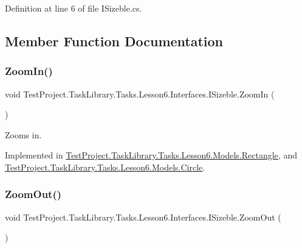 Definition at line 6 of file I\+Sizeble.\+cs.



\subsection{Member Function Documentation}
\mbox{\label{interface_test_project_1_1_task_library_1_1_tasks_1_1_lesson6_1_1_interfaces_1_1_i_sizeble_ada6181d54740d570d1575307c2574a0d}} 
\subsubsection{\texorpdfstring{ZoomIn()}{ZoomIn()}}
{\footnotesize\ttfamily void Test\+Project.\+Task\+Library.\+Tasks.\+Lesson6.\+Interfaces.\+I\+Sizeble.\+Zoom\+In (\begin{DoxyParamCaption}{ }\end{DoxyParamCaption})}



Zooms in. 



Implemented in \mbox{\hyperlink{class_test_project_1_1_task_library_1_1_tasks_1_1_lesson6_1_1_models_1_1_rectangle_a3e04e783432b8419633128bc394fb173}{Test\+Project.\+Task\+Library.\+Tasks.\+Lesson6.\+Models.\+Rectangle}}, and \mbox{\hyperlink{class_test_project_1_1_task_library_1_1_tasks_1_1_lesson6_1_1_models_1_1_circle_a9655a2ef826e2fc1e6dd7f9395d17c4b}{Test\+Project.\+Task\+Library.\+Tasks.\+Lesson6.\+Models.\+Circle}}.

\mbox{\label{interface_test_project_1_1_task_library_1_1_tasks_1_1_lesson6_1_1_interfaces_1_1_i_sizeble_ab4a49e0b6bbc4aa62f9ac1175b73e704}} 
\subsubsection{\texorpdfstring{ZoomOut()}{ZoomOut()}}
{\footnotesize\ttfamily void Test\+Project.\+Task\+Library.\+Tasks.\+Lesson6.\+Interfaces.\+I\+Sizeble.\+Zoom\+Out (\begin{DoxyParamCaption}{ }\end{DoxyParamCaption})}



